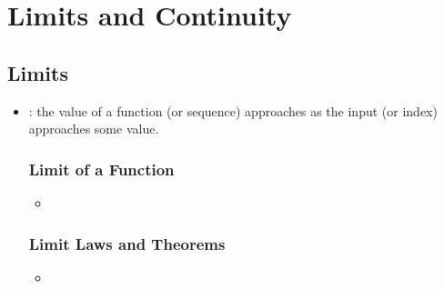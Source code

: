 \chapter{Limits and Continuity}

\section{Limits}


\smallskip

\begin{itemize}
  \item {}: the value of a function (or sequence) approaches as the input (or index) approaches some value. 

  \subsection{Limit of a Function}
  \begin{itemize}
    \item 
  \end{itemize}

  \subsection{Limit Laws and Theorems}
  \begin{itemize}
    \item 
  \end{itemize}
  
\end{itemize}

